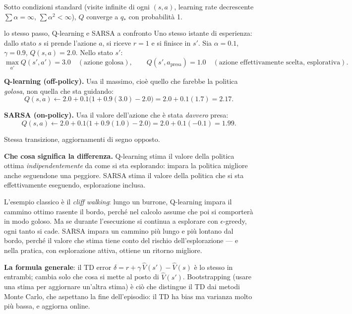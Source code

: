 \begin{theorem}
Sotto condizioni standard (visite infinite di ogni $(s,a)$, learning rate decrescente $\sum \alpha = \infty$, $\sum \alpha^2 < \infty$), $Q$ converge a $q_*$ con probabilità 1.
\end{theorem}

\begin{esempiosvolto}{lo stesso passo, Q-learning e SARSA a confronto}
Uno stesso istante di esperienza: dallo stato $s$ si prende l'azione $a$, si riceve $r = 1$ e si finisce in $s'$. Sia $\alpha = 0.1$, $\gamma = 0.9$, $Q(s,a) = 2.0$. Nello stato $s'$:
\[
\max_{a'} Q(s', a') = 3.0 \quad (\text{azione golosa}), \qquad Q(s', a_{\text{presa}}) = 1.0 \quad (\text{azione effettivamente scelta, esplorativa}).
\]

\medskip
\textbf{Q-learning (off-policy).} Usa il massimo, cioè quello che farebbe la politica \emph{golosa}, non quella che sta guidando:
\[
Q(s,a) \leftarrow 2.0 + 0.1\big(1 + 0.9(3.0) - 2.0\big) = 2.0 + 0.1(1.7) = \mathbf{2.17}.
\]

\textbf{SARSA (on-policy).} Usa il valore dell'azione che è stata \emph{davvero} presa:
\[
Q(s,a) \leftarrow 2.0 + 0.1\big(1 + 0.9(1.0) - 2.0\big) = 2.0 + 0.1(-0.1) = \mathbf{1.99}.
\]

Stessa transizione, aggiornamenti di segno opposto.

\medskip
\textbf{Che cosa significa la differenza.} Q-learning stima il valore della politica ottima \emph{indipendentemente} da come si sta esplorando: impara la politica migliore anche seguendone una peggiore. SARSA stima il valore della politica che si sta effettivamente eseguendo, esplorazione inclusa.

L'esempio classico è il \emph{cliff walking}: lungo un burrone, Q-learning impara il cammino ottimo rasente il bordo, perché nel calcolo assume che poi si comporterà in modo goloso. Ma se durante l'esecuzione si continua a esplorare con $\epsilon$-greedy, ogni tanto si cade. SARSA impara un cammino più lungo e più lontano dal bordo, perché il valore che stima tiene conto del rischio dell'esplorazione — e nella pratica, con esplorazione attiva, ottiene un ritorno migliore.

\textbf{La formula generale}: il TD error $\delta = r + \gamma\, \hat V(s') - \hat V(s)$ è lo stesso in entrambi; cambia solo che cosa si mette al posto di $\hat V(s')$. Bootstrapping (usare una stima per aggiornare un'altra stima) è ciò che distingue il TD dai metodi Monte Carlo, che aspettano la fine dell'episodio: il TD ha bias ma varianza molto più bassa, e aggiorna online.
\end{esempiosvolto}


